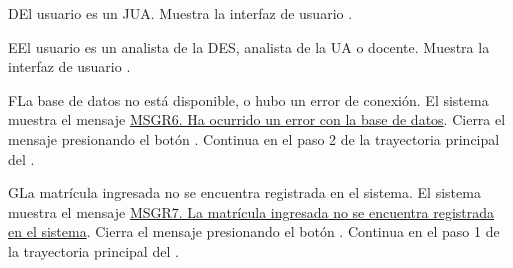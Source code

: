 \begin{UCtrayectoriaA}{D}{El usuario es un JUA.}
    \UCpaso Muestra la interfaz de usuario .
\end{UCtrayectoriaA}


\begin{UCtrayectoriaA}{E}{El usuario es un analista de la DES, analista de la UA o docente.}
    \UCpaso Muestra la interfaz de usuario .
\end{UCtrayectoriaA}


\begin{UCtrayectoriaA}{F}{La base de datos no está disponible, o hubo un error de conexión.}
    \UCpaso El sistema muestra el mensaje \hyperref[MSGR6]{MSGR6. Ha ocurrido un error con la base de datos}.
    \UCpaso[\UCactor] Cierra el mensaje presionando el botón .
    \UCpaso Continua en el paso 2 de la trayectoria principal del .
\end{UCtrayectoriaA}


\begin{UCtrayectoriaA}{G}{La matrícula ingresada no se encuentra registrada en el sistema.}
    \UCpaso El sistema muestra el mensaje \hyperref[MSGR7]{MSGR7. La matrícula ingresada no se encuentra registrada en el sistema}.
    \UCpaso[\UCactor] Cierra el mensaje presionando el botón .
    \UCpaso Continua en el paso 1 de la trayectoria principal del .
\end{UCtrayectoriaA}
